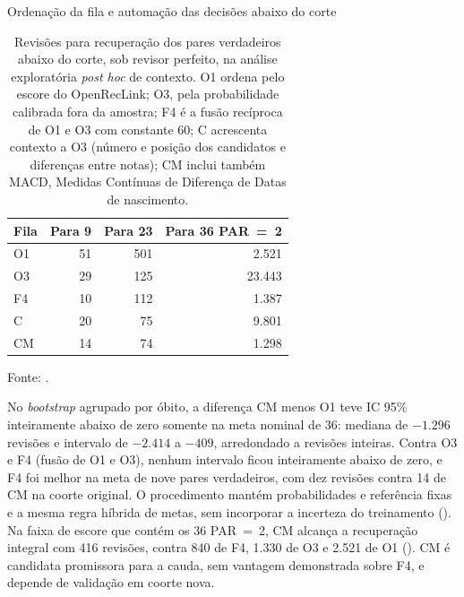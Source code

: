 \begin{chapter}{Ordenação da fila e automação das decisões abaixo do corte}
\begin{table}[!htbp]
\centering
\caption{Revisões para recuperação dos pares verdadeiros abaixo do corte, sob revisor perfeito, na análise exploratória \textit{post hoc} de contexto. O1 ordena pelo escore do OpenRecLink; O3, pela probabilidade calibrada fora da amostra; F4 é a fusão recíproca de O1 e O3 com constante 60; C acrescenta contexto a O3 (número e posição dos candidatos e diferenças entre notas); CM inclui também MACD, Medidas Contínuas de Diferença de Datas de nascimento.}
\label{tab:cap8-contexto-posthoc}
\begin{tabular}{lrrr}
\toprule
Fila & Para 9 & Para 23 & Para 36 PAR~=~2 \\
\midrule
O1 & 51 & 501 & 2.521 \\
O3 & 29 & 125 & 23.443 \\
F4 & 10 & 112 & 1.387 \\
C & 20 & 75 & 9.801 \\
CM & 14 & 74 & 1.298 \\
\bottomrule
\end{tabular}
\par\footnotesize Fonte: .
\end{table}

No \textit{bootstrap} agrupado por óbito, a diferença CM menos O1 teve IC 95\% inteiramente abaixo de zero somente na meta nominal de 36: mediana de $-1.296$ revisões e intervalo de $-2.414$ a $-409$, arredondado a revisões inteiras. Contra O3 e F4 (fusão de O1 e O3), nenhum intervalo ficou inteiramente abaixo de zero, e F4 foi melhor na meta de nove pares verdadeiros, com dez revisões contra 14 de CM na coorte original. O procedimento mantém probabilidades e referência fixas e a mesma regra híbrida de metas, sem incorporar a incerteza do treinamento (). Na faixa de escore que contém os 36 PAR~=~2, CM alcança a recuperação integral com 416 revisões, contra 840 de F4, 1.330 de O3 e 2.521 de O1 (). CM é candidata promissora para a cauda, sem vantagem demonstrada sobre F4, e depende de validação em coorte nova.


\end{chapter}
